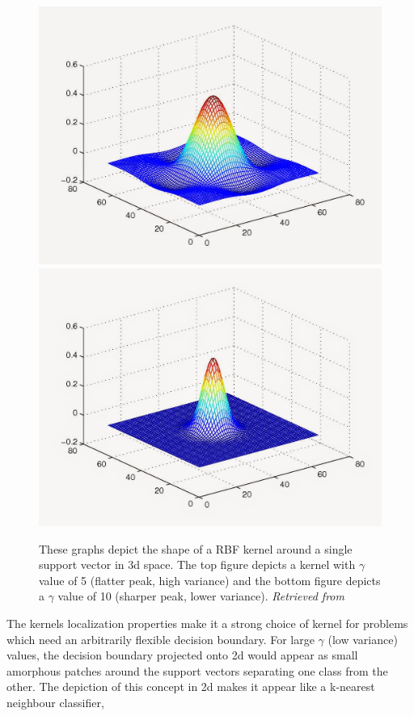 \documentclass[final,3p,times,twocolumn]{elsarticle}
\begin{document}
\begin{figure}
\includegraphics[scale=0.2]{Images/gamma_5.jpg}
\includegraphics[scale=0.2]{Images/gamma_10.jpg}
\caption{These graphs depict the shape of a RBF kernel around a single support vector in 3d space. The top figure depicts a kernel with $\gamma$ value of 5 (flatter peak, high variance) and the bottom figure depicts a $\gamma$ value of 10 (sharper peak, lower variance). \textit{Retrieved from \cite{RBF}}}
\label{rbf_kernels}
\end{figure}

The kernels localization properties make it a strong choice of kernel for problems which need an arbitrarily flexible decision boundary. For large $\gamma$ (low variance) values, the decision boundary projected onto 2d would appear as small amorphous patches around the support vectors separating one class from the other. The depiction of this concept in 2d makes it appear like a k-nearest neighbour classifier, 
\end{document}
